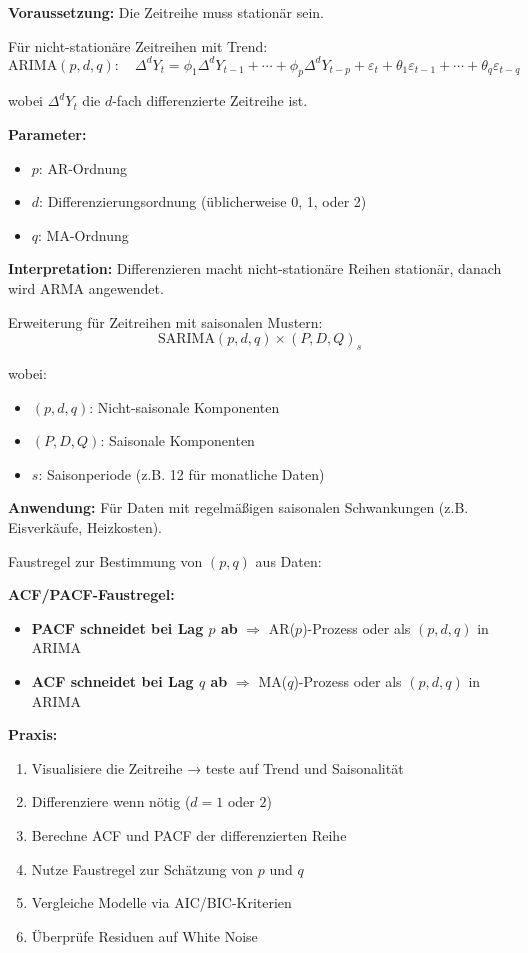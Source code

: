 \textbf{Voraussetzung:} Die Zeitreihe muss stationär sein.

Für nicht-stationäre Zeitreihen mit Trend:
$$\text{ARIMA}(p, d, q): \quad \Delta^d Y_t = \phi_1 \Delta^d Y_{t-1} + \cdots + \phi_p \Delta^d Y_{t-p} + \varepsilon_t + \theta_1 \varepsilon_{t-1} + \cdots + \theta_q \varepsilon_{t-q}$$

wobei $\Delta^d Y_t$ die $d$-fach differenzierte Zeitreihe ist.

\textbf{Parameter:}
\begin{itemize}[leftmargin=1.5em]
    \item $p$: AR-Ordnung
    \item $d$: Differenzierungsordnung (üblicherweise 0, 1, oder 2)
    \item $q$: MA-Ordnung
\end{itemize}

\textbf{Interpretation:} Differenzieren macht nicht-stationäre Reihen stationär, danach wird ARMA angewendet.

Erweiterung für Zeitreihen mit saisonalen Mustern:
$$\text{SARIMA}(p, d, q) \times (P, D, Q)_s$$

wobei:
\begin{itemize}[leftmargin=1.5em]
    \item $(p, d, q)$: Nicht-saisonale Komponenten
    \item $(P, D, Q)$: Saisonale Komponenten
    \item $s$: Saisonperiode (z.B. 12 für monatliche Daten)
\end{itemize}

\textbf{Anwendung:} Für Daten mit regelmäßigen saisonalen Schwankungen (z.B. Eisverkäufe, Heizkosten).

Faustregel zur Bestimmung von $(p, q)$ aus Daten:

\textbf{ACF/PACF-Faustregel:}
\begin{itemize}[leftmargin=1.5em]
    \item \textbf{PACF schneidet bei Lag $p$ ab} $\Rightarrow$ AR($p$)-Prozess oder als $(p, d, q)$ in ARIMA
    \item \textbf{ACF schneidet bei Lag $q$ ab} $\Rightarrow$ MA($q$)-Prozess oder als $(p, d, q)$ in ARIMA
\end{itemize}

\textbf{Praxis:}
\begin{enumerate}[leftmargin=1.5em]
    \item Visualisiere die Zeitreihe → teste auf Trend und Saisonalität
    \item Differenziere wenn nötig ($d = 1$ oder $2$)
    \item Berechne ACF und PACF der differenzierten Reihe
    \item Nutze Faustregel zur Schätzung von $p$ und $q$
    \item Vergleiche Modelle via AIC/BIC-Kriterien
    \item Überprüfe Residuen auf White Noise
\end{enumerate}

